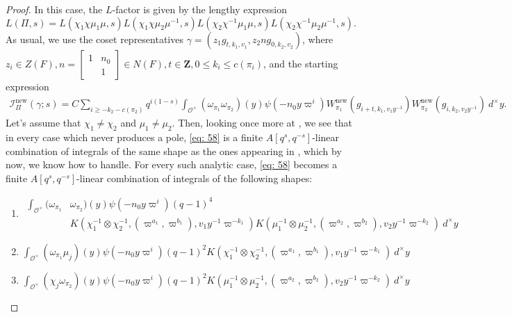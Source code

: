 \documentclass{amsart}
\theoremstyle{plain}
\theoremstyle{plain}
\theoremstyle{remark}
\begin{document}
\begin{proof}
    In this case, the $L$-factor is given by the lengthy expression
$$L(\Pi,s)=L(\chi_1\chi\mu_1\mu,s)L(\chi_1\chi\mu_2\mu^{-1},s)L(\chi_2\chi^{-1}\mu_1\mu,s)L(\chi_2\chi^{-1}\mu_2\mu^{-1},s).$$
As usual, we use the coset representatives $\gamma=(z_1g_{t,k_1,v_1},z_2ng_{0,k_2,v_2})$, where $z_i\in Z(F),n=\left[\begin{smallmatrix}
            1 & n_0\\
            & 1
        \end{smallmatrix}\right]\in N(F),t\in\mathbf{Z}, 0\leq k_i\leq c(\pi_i)$, and the starting expression
        \begin{align}\label{eq: 58}
            {\mathcal{I}_{\Pi}^\mathrm{new}(\gamma;s)=C\sum_{i\geq -k_2-c(\pi_2)}q^{i(1-s)}\int_{\mathcal{O}^\times}(\omega_{\pi_1}\omega_{\pi_2})(y)\psi(-n_0y\varpi^i)W_{\pi_1}^\mathrm{new}(g_{i+t,k_1,v_1y^{-1}})W_{\pi_2}^\mathrm{new}(g_{i,k_2,v_2y^{-1}})\ d^\times y}.
        \end{align}
       Let's assume that $\chi_1\neq \chi_2$ and $\mu_1\neq \mu_2$. Then, looking once more at \cite[Lemma $3.6$]{Assing_2018}, we see that in every case which never produces a pole, \eqref{eq: 58} is a finite $A[q^s,q^{-s}]$-linear combination of integrals of the same shape as the ones appearing in , which by now, we know how to handle. For every such analytic case, \eqref{eq: 58} becomes a finite $A[q^s,q^{-s}]$-linear combination of integrals of the following shapes:
        \begin{enumerate}
\item\begin{align*}\displaystyle\int_{\mathcal{O}^\times}(\omega_{\pi_1}&\omega_{\pi_2})(y)\psi(-n_0y\varpi^{i})(q-1)^4 \\
            &K(\chi_1^{-1}\otimes \chi_2^{-1},(\varpi^{a_1},\varpi^{b_1}),v_1y^{-1}\varpi^{-k_1})K(\mu_1^{-1}\otimes \mu_2^{-1},(\varpi^{a_2},\varpi^{b_2}),v_2y^{-1}\varpi^{-k_2})\ d^\times y\end{align*}
            \item ${\displaystyle\int_{\mathcal{O}^\times}(\omega_{\pi_1}\mu_j)(y)\psi(-n_0y\varpi^{i})(q-1)^2K(\chi_1^{-1}\otimes \chi_2^{-1},(\varpi^{a_1},\varpi^{b_1}),v_1y^{-1}\varpi^{-k_1})\ d^\times y}$
            \item ${\displaystyle\int_{\mathcal{O}^\times}(\chi_j\omega_{\pi_2})(y)\psi(-n_0y\varpi^{i})(q-1)^2K(\mu_1^{-1}\otimes \mu_2^{-1},(\varpi^{a_2},\varpi^{b_2}),v_2y^{-1}\varpi^{-k_2})\ d^\times y}$

\end{enumerate}
\end{proof}
\end{document}
